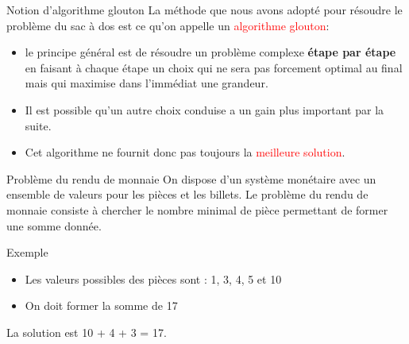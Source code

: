 \documentclass[10pt]{beamer}
\begin{document}
% 
\begin{frame}
    \mframe{\AG}
    \begin{block}{Notion d'algorithme glouton}
        La méthode que nous avons adopté pour résoudre le problème du sac à dos est ce qu'on appelle un \textcolor{red}{algorithme glouton}:
        \begin{itemize}[label=\textbullet]
            \item<2->  le principe général est de résoudre un problème complexe \textbf{étape par étape} en faisant à chaque étape un choix qui ne sera pas forcement optimal au final mais qui maximise dans l'immédiat une grandeur.
            \item<3-> Il est possible qu'un autre choix conduise a un gain plus important par la suite.
            \item<4-> Cet algorithme ne fournit donc pas toujours la \textcolor{red}{meilleure solution}.
        \end{itemize}
    \end{block}
\end{frame}

% 
\begin{frame}
    \mframe{\AG}
    \begin{block}{Problème du rendu de monnaie}
        On dispose d'un système monétaire avec un ensemble de valeurs pour les pièces et les billets. Le problème du rendu de monnaie consiste à chercher le nombre minimal de pièce permettant de former une somme donnée.
    \end{block}
    \begin{exampleblock}{Exemple}
        \begin{itemize}[label=\textbullet]
            \item<2-> Les valeurs possibles des pièces sont : 1, 3, 4, 5 et 10
            \item<3-> On doit former la somme de 17
        \end{itemize}
         \textcolor{OliveGreen}{La solution est 10 + 4 + 3 = 17.}
    \end{exampleblock}
\end{frame}
\end{document}

